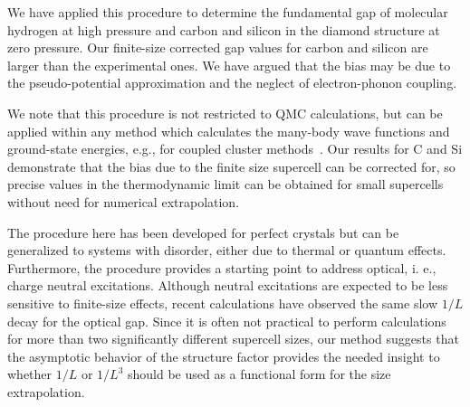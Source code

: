 We have applied this procedure to determine the fundamental gap of molecular hydrogen at high pressure
and carbon and silicon in the diamond structure at zero pressure. Our finite-size corrected gap values for carbon and silicon are larger than the experimental
ones. We have argued that the bias may be due to the pseudo-potential approximation and the neglect of electron-phonon coupling.

We note that this procedure is not restricted to QMC calculations, but can be applied
within any method which calculates the many-body wave functions and ground-state energies,
e.g., for coupled cluster methods~\cite{Gruber18}. Our results for C and Si demonstrate that
the bias due to the finite size supercell can be corrected for, so
precise values in the thermodynamic limit can be obtained for small supercells
without need for numerical extrapolation.

The procedure here has been developed for perfect crystals but can be generalized 
to systems with disorder, either due to thermal or quantum effects. Furthermore, the procedure provides a starting point 
to address optical, i. e.,  charge neutral excitations. Although neutral excitations are expected to be less sensitive to finite-size effects,
recent calculations \cite{Hunt,Frank19} have observed the same slow $1/L$ decay for the 
optical gap. Since it is often not practical to perform calculations for more than two significantly different supercell sizes, our method suggests that 
the asymptotic behavior of the structure factor provides
the needed insight to whether $1/L$ or $1/L^3$ should be used as a functional form for the
size extrapolation.

